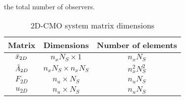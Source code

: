 the total number of observers.
\begin{table}[h]
    \centering
    \begin{tabular}{|c|c|c|}
       \toprule
       Matrix  & Dimensions & Number of elements \\ \midrule
       $\Tilde{x}_{2D}$  & $n_xN_S \times 1$ & $n_xN_S$ \\
       $\Tilde{A}_{2D}$ & $n_xN_S \times n_xN_S$ & $n_x^2N_S^2$ \\
       $F_{2D}$ & $n_u \times N_S$ & $n_uN_S$ \\
       $u_{2D}$ & $n_u \times N_S$ & $n_uN_S$ \\
       \bottomrule
    \end{tabular}
    \caption{2D-CMO system matrix dimensions}
    \label{tab:2D-CMO-dimensions}
\end{table}


